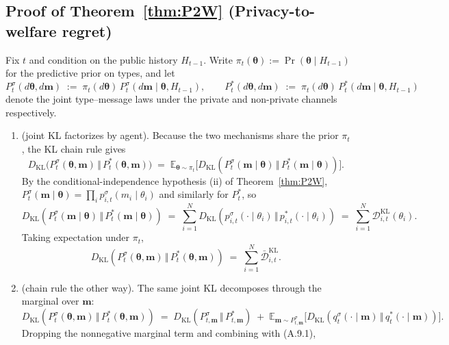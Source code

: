 \documentclass{article}
\begin{document}
\subsection{Proof of Theorem~\ref{thm:P2W} (Privacy-to-welfare regret)}\label{app:P2W}

Fix $t$ and condition on the public history $H_{t-1}$. Write $\pi_t(\boldsymbol\theta) := \Pr(\boldsymbol\theta \mid H_{t-1})$ for the predictive prior on types, and let
$$P_t^\sigma(d\boldsymbol\theta, d\mathbf m) \;:=\; \pi_t(d\boldsymbol\theta)\,P_t^\sigma(d\mathbf m \mid \boldsymbol\theta, H_{t-1}), \qquad P_t^*(d\boldsymbol\theta, d\mathbf m) \;:=\; \pi_t(d\boldsymbol\theta)\,P_t^*(d\mathbf m \mid \boldsymbol\theta, H_{t-1})$$
denote the joint type–message laws under the private and non-private channels respectively.

\begin{enumerate}
    \item[Step 1] (joint KL factorizes by agent). Because the two mechanisms share the prior $\pi_t$, the KL chain rule gives
$$D_{\mathrm{KL}}\big(P_t^\sigma(\boldsymbol\theta, \mathbf m) \,\Vert\, P_t^*(\boldsymbol\theta, \mathbf m)\big) \;=\; \mathbb{E}_{\boldsymbol\theta \sim \pi_t}\big[D_{\mathrm{KL}}(P_t^\sigma(\mathbf m \mid \boldsymbol\theta) \,\Vert\, P_t^*(\mathbf m \mid \boldsymbol\theta))\big].$$
By the conditional-independence hypothesis (ii) of Theorem~\ref{thm:P2W}, $P_t^\sigma(\mathbf m \mid \boldsymbol\theta) = \prod_i p_{i,t}^\sigma(m_i \mid \theta_i)$ and similarly for $P_t^*$, so
$$D_{\mathrm{KL}}(P_t^\sigma(\mathbf m \mid \boldsymbol\theta) \,\Vert\, P_t^*(\mathbf m \mid \boldsymbol\theta)) \;=\; \sum_{i=1}^N D_{\mathrm{KL}}(p_{i,t}^\sigma(\cdot \mid \theta_i) \,\Vert\, p_{i,t}^*(\cdot \mid \theta_i)) \;=\; \sum_{i=1}^N \mathcal{D}_{i,t}^{\mathrm{KL}}(\theta_i).$$
Taking expectation under $\pi_t$,
$$D_{\mathrm{KL}}(P_t^\sigma(\boldsymbol\theta, \mathbf m) \,\Vert\, P_t^*(\boldsymbol\theta, \mathbf m)) \;=\; \sum_{i=1}^N \bar{\mathcal{D}}_{i,t}^{\mathrm{KL}}. \tag{A.9.1}$$
    \item[Step 2] (chain rule the other way). The same joint KL decomposes through the marginal over $\mathbf m$:
$$D_{\mathrm{KL}}(P_t^\sigma(\boldsymbol\theta, \mathbf m) \,\Vert\, P_t^*(\boldsymbol\theta, \mathbf m)) \;=\; D_{\mathrm{KL}}(P_{t,\mathbf m}^\sigma \,\Vert\, P_{t,\mathbf m}^*) \;+\; \mathbb{E}_{\mathbf m \sim P_{t,\mathbf m}^\sigma}\big[D_{\mathrm{KL}}(q_t^\sigma(\cdot \mid \mathbf m) \,\Vert\, q_t^*(\cdot \mid \mathbf m))\big].$$
Dropping the nonnegative marginal term and combining with (A.9.1),

\end{enumerate}
\end{document}
